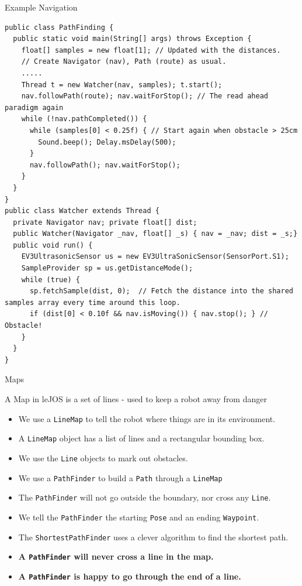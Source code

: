 \documentclass[color=pdftex,usenames,dvipsnames, aspectratio=169]{beamer}
\begin{document}
\begin{frame}[fragile]{Example Navigation}
\vspace*{-3mm}
\begin{lstlisting}[basicstyle=\ttfamily\tiny\color{blue}]
public class PathFinding {
  public static void main(String[] args) throws Exception {
    float[] samples = new float[1]; // Updated with the distances.
    // Create Navigator (nav), Path (route) as usual.
    .....
    Thread t = new Watcher(nav, samples); t.start();
    nav.followPath(route); nav.waitForStop(); // The read ahead paradigm again
    while (!nav.pathCompleted()) {
      while (samples[0] < 0.25f) { // Start again when obstacle > 25cm
        Sound.beep(); Delay.msDelay(500); 
      }
      nav.followPath(); nav.waitForStop();
    }
  }
}
public class Watcher extends Thread {
  private Navigator nav; private float[] dist;
  public Watcher(Navigator _nav, float[] _s) { nav = _nav; dist = _s;}
  public void run() {
    EV3UltrasonicSensor us = new EV3UltraSonicSensor(SensorPort.S1);
    SampleProvider sp = us.getDistanceMode();
    while (true) {
      sp.fetchSample(dist, 0);  // Fetch the distance into the shared samples array every time around this loop.
      if (dist[0] < 0.10f && nav.isMoving()) { nav.stop(); } // Obstacle!
    }
  }
}
\end{lstlisting}
\end{frame}

\begin{frame}{Maps}
\begin{block}{A Map in leJOS is a set of lines - used to keep a robot away from danger}
\begin{itemize}
\item We use a \lstinline!LineMap! to tell the robot where things are in its environment.
\item A \lstinline!LineMap! object has a list of lines and a rectangular bounding box.
\item We use the \lstinline!Line! objects to mark out obstacles.
\item We use a \lstinline!PathFinder! to build a \lstinline!Path! through a \lstinline!LineMap!
\item The \lstinline!PathFinder! will not go outside the boundary, nor cross any \lstinline!Line!.
\item We tell the \lstinline!PathFinder! the starting \lstinline!Pose! and an ending \lstinline!Waypoint!.
\item The \lstinline!ShortestPathFinder! uses a clever algorithm to find the shortest path.
\item \textbf{A \lstinline!PathFinder! will never cross a line in the map.}
\item \textbf{A \lstinline!PathFinder! is happy to go through the end of a line.}
\end{itemize}
\end{block}
\end{frame}
\end{document}
